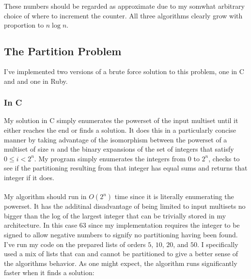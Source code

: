 \documentclass[11pt]{article}
\begin{document}
    
    \noindent
    These numbers should be regarded as approximate due to my somwhat
    arbitrary choice of where to increment the counter.  All three
    algorithms clearly grow with proportion to $n \log{n}$.

\subsection*{The Partition Problem}
\label{sec-1.2}

  \noindent
  I've implemented two versions of a brute force solution to this
  problem, one in C and and one in Ruby.

\subsubsection*{In C}
\label{sec-1.2.1}

    My solution in C simply enumerates the powerset of the input
    multiset until it either reaches the end or finds a solution.  It
    does this in a particularly concise manner by taking advantage of
    the isomorphism between the powerset of a multiset of size $n$ and
    the binary expansions of the set of integers that satisfy $0 \le i
    < 2^n$.  My program simply enumerates the integers from $0$ to
    $2^n$, checks to see if the partitioning resulting from that
    integer has equal sums and returns that integer if it does. \\
    \\
    \noindent
    My algorithm should run in $O(2^n)$ time since it is literally
    enumerating the powerset.  It has the additinal disadvantage of
    being limited to input multisets no bigger than the log of the
    largest integer that can be trivially stored in my architecture.
    In this case $63$ since my implementation requires the integer to
    be signed to allow negative numbers to signify no partitioning
    having been found.  I've run my code on the prepared lists of
    orders $5$, $10$, $20$, and $50$.  I specifically used a mix of
    lists that can and cannot be partitioned to give a better sense of
    the algorithms behavior.  As one might expect, the algorithm runs
    significantly faster when it finds a solution:
    
\end{document}
